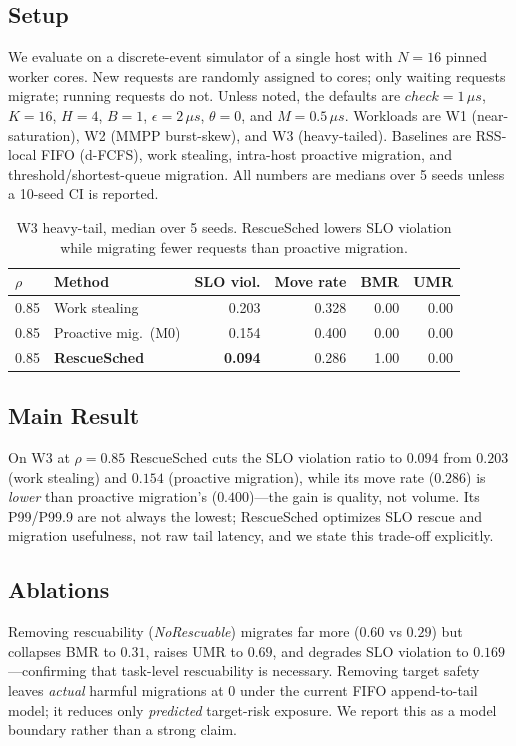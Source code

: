 \subsection{Setup}
We evaluate on a discrete-event simulator of a single host with $N{=}16$
pinned worker cores. New requests are randomly assigned to cores; only
waiting requests migrate; running requests do not. Unless noted, the
defaults are $check{=}1\,\mu s$, $K{=}16$, $H{=}4$, $B{=}1$,
$\epsilon{=}2\,\mu s$, $\theta{=}0$, and $M{=}0.5\,\mu s$. Workloads are
W1 (near-saturation), W2 (MMPP burst-skew), and W3 (heavy-tailed).
Baselines are RSS-local FIFO (d-FCFS), work stealing, intra-host
proactive migration, and threshold/shortest-queue migration. All numbers
are medians over 5 seeds unless a 10-seed CI is reported.


\begin{table}[t]
\centering
\caption{W3 heavy-tail, median over 5 seeds. RescueSched lowers SLO
violation while migrating fewer requests than proactive migration.}
\label{tab:main}
\small
\begin{tabular}{@{}llrrrr@{}}
\toprule
$\rho$ & Method & SLO viol. & Move rate & BMR & UMR \\
\midrule
0.85 & Work stealing        & 0.203 & 0.328 & 0.00 & 0.00 \\
0.85 & Proactive mig.\ (M0) & 0.154 & 0.400 & 0.00 & 0.00 \\
0.85 & \textbf{RescueSched} & \textbf{0.094} & 0.286 & 1.00 & 0.00 \\
\bottomrule
\end{tabular}
\end{table}

\subsection{Main Result}
On W3 at $\rho{=}0.85$ RescueSched cuts the SLO violation ratio to
$0.094$ from $0.203$ (work stealing) and $0.154$ (proactive migration),
while its move rate ($0.286$) is \emph{lower} than proactive migration's
($0.400$)---the gain is quality, not volume. Its P99/P99.9 are not always
the lowest; RescueSched optimizes SLO rescue and migration usefulness,
not raw tail latency, and we state this trade-off explicitly.

\subsection{Ablations}
Removing rescuability (\emph{NoRescuable}) migrates far more
($0.60$ vs $0.29$) but collapses BMR to $0.31$, raises UMR to $0.69$, and
degrades SLO violation to $0.169$---confirming that task-level
rescuability is necessary. Removing target safety leaves \emph{actual}
harmful migrations at $0$ under the current FIFO append-to-tail model; it
reduces only \emph{predicted} target-risk exposure. We report this as a
model boundary rather than a strong claim.

